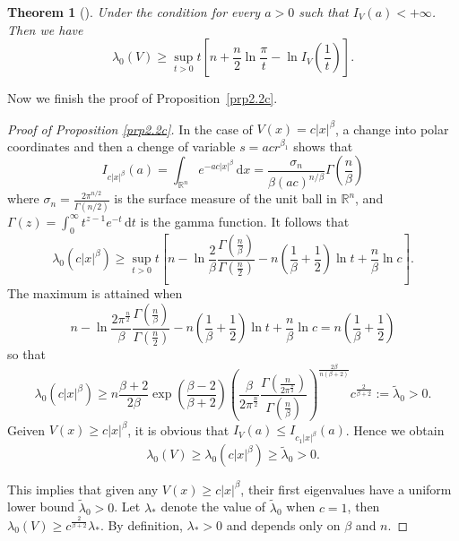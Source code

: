 \documentclass{article}
\numberwithin{equation}{section}
\renewcommand{\d}{\,\mathrm{d}}
\newcommand\R{\ensuremath{\mathbb{R}}}
\newtheorem{theorem}{Theorem}[section]
\numberwithin{equation}{section}
\theoremstyle{definition}
\begin{document}
\begin{theorem}[{\cite{barnes1976lower}}]
	Under the condition for every $a>0$ such that $I_V(a)<+\infty$. Then we have
	\begin{equation*}
		\lambda_0(V)\ge \sup_{t>0}t\left[ n +\frac{n}{2}\ln \frac{\pi}{t}-\ln I_V\left( \frac{1}{t} \right)  \right].
	\end{equation*}
\end{theorem}
Now we finish the proof of Proposition~\ref{prp2.2c}.
\begin{proof}[Proof of Proposition \ref{prp2.2c}]
In the case of $V(x)=c|x|^{\beta}$, a change into polar coordinates and then a chenge of variable $s=acr^{\beta _1}$ shows that 
\[
I_{c|x|^{\beta}}(a)= \int_{\R^{n}}e^{-ac|x|^{\beta}}\d x= \frac{\sigma _n}{\beta (a c) ^{n / \beta}}\Gamma\left( \frac{n}{\beta} \right) 
\] 
where $\displaystyle \sigma _n= \frac{2 \pi^{ n /2}}{\Gamma\left( n /2 \right) }$ is the surface measure of the unit ball in $\R^{n}$, and $\displaystyle\Gamma (z)=\int_0^{\infty}t ^{z-1}e^{-t}\d t$ is the gamma function. It follows that 
\[
\lambda_0\left( c|x|^{\beta} \right)\ge \sup_{t>0}t\left[ n-\ln \frac{2}{\beta} \frac{\Gamma\left( \frac{n}{\beta} \right) }{\Gamma\left( \frac{n}{2} \right) }-n\left( \frac{1}{\beta}+\frac{1}{2} \right) \ln t + \frac{n}{\beta}\ln c\right].  
\]
The maximum is attained when
\[
n-\ln \frac{2\pi^{\frac{n}{2}}}{\beta}\frac{\Gamma\left( \frac{n}{\beta} \right) }{\Gamma\left( \frac{n}{2} \right) }-n\left( \frac{1}{\beta}+\frac{1}{2} \right) \ln t + \frac{n}{\beta}\ln c =n \left( \frac{1}{\beta}+\frac{1}{2} \right) 
\] 
so that
\[
\lambda_0(c|x|^{\beta}) \ge n \frac{\beta+2}{2\beta}\exp \left( \frac{\beta-2}{\beta+2} \right) \left( \frac{\beta }{2 \pi^{\frac{n}{2}}} \frac{\Gamma\left( \frac{n}{2\pi^{\frac{n}{2}}} \right) }{\Gamma\left( \frac{n}{\beta} \right) } \right) ^{ \frac{2\beta}{n\left( \beta+2 \right) }}c^{\frac{2}{\beta+2}}:= \widetilde{\lambda}_0>0.
\]
Geiven $V(x)\ge c|x|^{\beta}$, it is obvious that $I_V(a)\le I_{c_1|x|^{\beta}}(a)$. Hence we obtain
\[
\lambda_0(V)\ge \lambda_0(c|x|^{\beta})\ge \widetilde{\lambda}_0>0.
\]

This implies that given any $V(x)\ge c|x|^{\beta}$, their first eigenvalues have a uniform lower bound $\widetilde{\lambda}_0>0$. Let $\lambda_*$ denote the value of $\widetilde{\lambda}_0$ when $c=1$, then  $\lambda_0(V)\ge c ^{\frac{2}{ \beta+2}}\lambda_*$. By definition, $\lambda_*>0$ and depends only on $\beta$ and $n$.
\end{proof}
\end{document}
